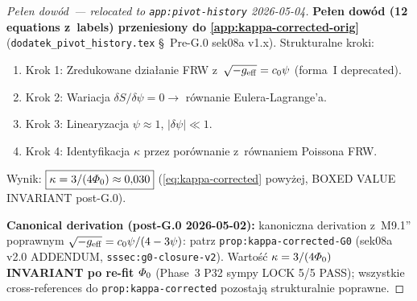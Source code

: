 \begin{proof}[Pe\l{}en dow\'od~--- relocated to \texttt{app:pivot-history} 2026-05-04]
%
%

\textbf{Pe\l{}en dow\'od (12 equations z~labels) przeniesiony do
\ref{app:kappa-corrected-orig}} (\texttt{dodatek\_pivot\_history.tex}
\S~Pre-G.0 sek08a v1.x). Strukturalne kroki:

\begin{enumerate}[(1),nosep]
  \item Krok 1: Zredukowane dzia\l{}anie FRW z~$\sqrt{-g_{\rm eff}}=c_0\psi$
    (forma~I deprecated).
  \item Krok 2: Wariacja $\delta S/\delta\psi = 0 \to$ r\'ownanie
    Eulera-Lagrange'a.
  \item Krok 3: Linearyzacja $\psi \approx 1$, $|\delta\psi| \ll 1$.
  \item Krok 4: Identyfikacja $\kappa$ przez por\'ownanie
    z~r\'ownaniem Poissona FRW.
\end{enumerate}

Wynik: $\boxed{\kappa = 3/(4\varPhi_0) \approx 0{,}030}$
(\eqref{eq:kappa-corrected} powy\.zej, BOXED VALUE INVARIANT post-G.0).

\textbf{Canonical derivation (post-G.0 2026-05-02):} kanoniczna
derivation z~M9.1'' poprawnym $\sqrt{-g_{\rm eff}} = c_0\psi/(4-3\psi)$:
patrz \texttt{prop:kappa-corrected-G0} (sek08a v2.0 ADDENDUM,
\texttt{sssec:g0-closure-v2}). Warto\'s\'c $\kappa = 3/(4\varPhi_0)$
\textbf{INVARIANT po re-fit $\varPhi_0$} (Phase~3 P32 sympy LOCK 5/5 PASS);
wszystkie cross-references do \texttt{prop:kappa-corrected} pozostaj\k{a}
strukturalnie poprawne.
\end{proof}

